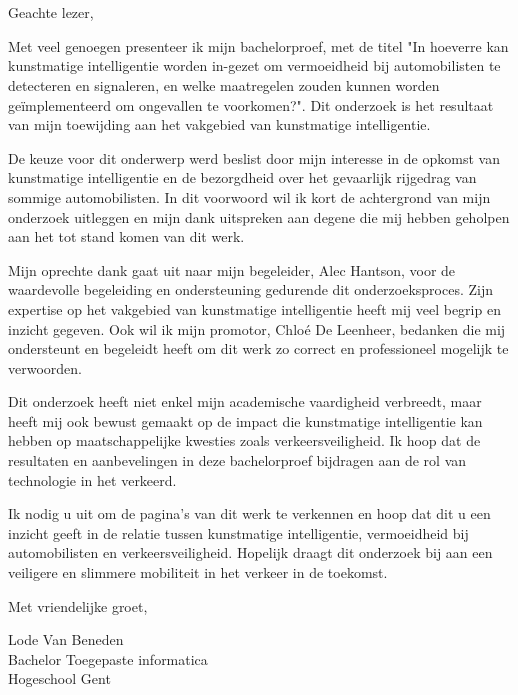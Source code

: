 
\chapter*{}%
\label{ch:voorwoord}
\setlength{\parskip}{1em}
Geachte lezer,

Met veel genoegen presenteer ik mijn bachelorproef, met de titel "In hoeverre kan kunstmatige intelligentie worden in-gezet om vermoeidheid bij automobilisten te detecteren en signaleren, en welke maatregelen zouden kunnen worden geïmplementeerd om ongevallen te voorkomen?".
Dit onderzoek is het resultaat van mijn toewijding aan het vakgebied van kunstmatige intelligentie.

De keuze voor dit onderwerp werd beslist door mijn interesse in de opkomst van kunstmatige intelligentie en de bezorgdheid over het gevaarlijk rijgedrag van sommige automobilisten. In dit voorwoord
wil ik kort de achtergrond van mijn onderzoek uitleggen en mijn dank uitspreken aan degene die mij hebben geholpen aan het tot stand komen van dit werk.

Mijn oprechte dank gaat uit naar mijn begeleider, Alec Hantson, voor de waardevolle begeleiding en ondersteuning gedurende dit onderzoeksproces. Zijn expertise op het vakgebied van kunstmatige intelligentie heeft mij veel begrip en inzicht gegeven.
Ook wil ik mijn promotor, Chloé De Leenheer, bedanken die mij ondersteunt en begeleidt heeft om dit werk zo correct en professioneel mogelijk te verwoorden.

Dit onderzoek heeft niet enkel mijn academische vaardigheid verbreedt, maar heeft mij ook bewust gemaakt op de impact die kunstmatige intelligentie kan hebben op maatschappelijke kwesties zoals verkeersveiligheid.
Ik hoop dat de resultaten en aanbevelingen in deze bachelorproef bijdragen aan de rol van technologie in het verkeerd.

Ik nodig u uit om de pagina's van dit werk te verkennen en hoop dat dit u een inzicht geeft in de relatie tussen kunstmatige intelligentie, vermoeidheid bij automobilisten en verkeersveiligheid.
Hopelijk draagt dit onderzoek bij aan een veiligere en slimmere mobiliteit in het verkeer in de toekomst.

Met vriendelijke groet,

Lode Van Beneden
\\
Bachelor Toegepaste informatica
\\
Hogeschool Gent